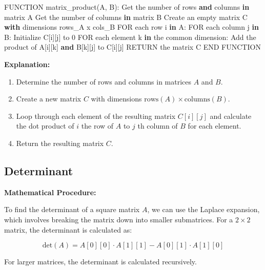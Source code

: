 \documentclass[
  letterpaper,
  DIV=11,
  numbers=noendperiod]{scrreprt}
\newenvironment{Shaded}{\begin{snugshade}}{\end{snugshade}}
\newcommand{\ControlFlowTok}[1]{\textcolor[rgb]{0.00,0.23,0.31}{\textbf{#1}}}
\newcommand{\DecValTok}[1]{\textcolor[rgb]{0.68,0.00,0.00}{#1}}
\newcommand{\KeywordTok}[1]{\textcolor[rgb]{0.00,0.23,0.31}{\textbf{#1}}}
\newcommand{\NormalTok}[1]{\textcolor[rgb]{0.00,0.23,0.31}{#1}}
\providecommand{\tightlist}{%
  \setlength{\itemsep}{0pt}\setlength{\parskip}{0pt}}\usepackage{longtable,booktabs,array}
\theoremstyle{plain}
\theoremstyle{definition}
\theoremstyle{remark}
\begin{document}
\begin{Shaded}
\begin{Highlighting}[]
\NormalTok{FUNCTION matrix\_product(A, B):}
\NormalTok{    Get the number of rows }\KeywordTok{and}\NormalTok{ columns }\KeywordTok{in}\NormalTok{ matrix A}
\NormalTok{    Get the number of columns }\KeywordTok{in}\NormalTok{ matrix B}
\NormalTok{    Create an empty matrix C }\ControlFlowTok{with}\NormalTok{ dimensions rows\_A x cols\_B}
\NormalTok{    FOR each row i }\KeywordTok{in}\NormalTok{ A:}
\NormalTok{        FOR each column j }\KeywordTok{in}\NormalTok{ B:}
\NormalTok{            Initialize C[i][j] to }\DecValTok{0}
\NormalTok{            FOR each element k }\KeywordTok{in}\NormalTok{ the common dimension:}
\NormalTok{                Add the product of A[i][k] }\KeywordTok{and}\NormalTok{ B[k][j] to C[i][j]}
\NormalTok{    RETURN the matrix C}
\NormalTok{END FUNCTION}
\end{Highlighting}
\end{Shaded}

\textbf{Explanation:}

\begin{enumerate}
\def\labelenumi{\arabic{enumi}.}
\tightlist
\item
  Determine the number of rows and columns in matrices \(A\) and \(B\).
\item
  Create a new matrix \(C\) with dimensions
  \(\text{rows}(A)\times \text{columns}(B)\).
\item
  Loop through each element of the resulting matrix \(C[i][j]\) and
  calculate the dot product of \(i\) the row of \(A\) to \(j\) th column
  of \(B\) for each element.
\item
  Return the resulting matrix \(C\).
\end{enumerate}

\subsection{Determinant}\label{determinant}

\textbf{Mathematical Procedure:}

To find the determinant of a square matrix \(A\), we can use the Laplace
expansion, which involves breaking the matrix down into smaller
submatrices. For a \(2 \times 2\) matrix, the determinant is calculated
as:

\[\text{det}(A) = A[0][0] \cdot A[1][1] - A[0][1] \cdot A[1][0]\]

For larger matrices, the determinant is calculated recursively.
\end{document}
